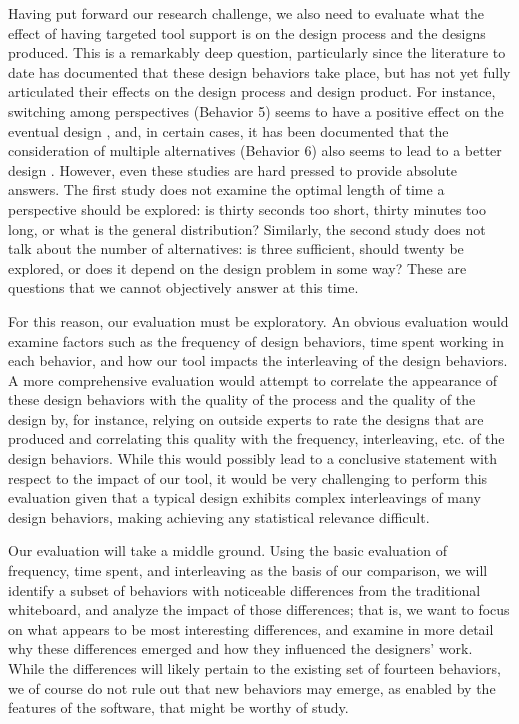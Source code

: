 Having put forward our research challenge, we also need to evaluate what the effect of having targeted tool support is on the design process and the designs produced. This is a remarkably deep question, particularly since the literature to date has documented that these design behaviors take place, but has not yet fully articulated their effects on the design process and design product. For instance, switching among perspectives (Behavior 5) seems to have a positive effect on the eventual design \cite{baker2010ideas}, and, in certain cases, it has been documented that the consideration of multiple alternatives (Behavior 6) also seems to lead to a better design \cite{buxton2010sketching}. However, even these studies are hard pressed to provide absolute answers. The first study does not examine the optimal length of time a perspective should be explored: is thirty seconds too short, thirty minutes too long, or what is the general distribution? Similarly, the second study does not talk about the number of alternatives: is three sufficient, should twenty be explored, or does it depend on the design problem in some way? These are questions that we cannot objectively answer at this time. 

For this reason, our evaluation must be exploratory. An obvious evaluation would examine factors such as the frequency of design behaviors, time spent working in each behavior, and how our tool impacts the interleaving of the design behaviors. A more comprehensive evaluation would attempt to correlate the appearance of these design behaviors with the quality of the process and the quality of the design by, for instance, relying on outside experts to rate the designs that are produced and correlating this quality with the frequency, interleaving, etc. of the design behaviors. While this would possibly lead to a conclusive statement with respect to the impact of our tool, it would be very challenging to perform this evaluation given that a typical design exhibits complex interleavings of many design behaviors, making achieving any statistical relevance difficult. 

Our evaluation will take a middle ground. Using the basic evaluation of frequency, time spent, and interleaving as the basis of our comparison, we will identify a subset of behaviors with noticeable differences from the traditional whiteboard, and analyze the impact of those differences; that is, we want to focus on what appears to be most interesting differences, and examine in more detail why these differences emerged and how they influenced the designers' work. While the differences will likely pertain to the existing set of fourteen behaviors, we of course do not rule out that new behaviors may emerge, as enabled by the features of the software, that might be worthy of study. 


